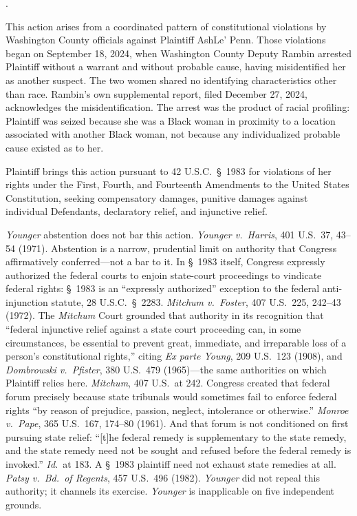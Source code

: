 \documentclass[12pt,letterpaper]{article}
\newcounter{complaintpara}
\newenvironment{paras}{%
	\begin{list}{\arabic{complaintpara}.}{%
			\setlength{\leftmargin}{0.5in}%
			\setlength{\labelwidth}{0.4in}%
			\setlength{\labelsep}{0.1in}%
			\setlength{\itemsep}{0pt}%
			\setlength{\parsep}{0pt}%
			\setlength{\topsep}{6pt}%
		}%
	}{%
	\end{list}%
}
\newcommand{\sect}{§}
\begin{document}
\begin{paras}
		\item This action arises from a coordinated pattern of constitutional
		violations by Washington County officials against Plaintiff AshLe'
		Penn. Those violations began on September 18, 2024, when Washington
		County Deputy Rambin arrested Plaintiff without a warrant and without
		probable cause, having misidentified her as another suspect. The two
		women shared no identifying characteristics other than race. Rambin's
		own supplemental report, filed December 27, 2024, acknowledges the
		misidentification. The arrest was the product of racial profiling:
		Plaintiff was seized because she was a Black woman in proximity to a
		location associated with another Black woman, not because any
		individualized probable cause existed as to her.
		
		\item Plaintiff brings this action pursuant to 42 U.S.C.\ \sect\ 1983
		for violations of her rights under the First, Fourth, and Fourteenth
		Amendments to the United States Constitution, seeking compensatory
		damages, punitive damages against individual Defendants, declaratory
		relief, and injunctive relief.
		
		\item \textit{Younger} abstention does not bar this action.
		\textit{Younger v.\ Harris}, 401 U.S.\ 37, 43--54 (1971).
		Abstention is a narrow, prudential limit on authority that Congress affirmatively conferred---not a bar to it. In \sect\ 1983 itself, Congress expressly authorized the federal courts to enjoin state-court proceedings to vindicate federal rights: \sect\ 1983 is an ``expressly authorized'' exception to the federal anti-injunction statute, 28 U.S.C.\ \S\ 2283. \textit{Mitchum v.\ Foster}, 407 U.S.\ 225, 242--43 (1972). The \textit{Mitchum} Court grounded that authority in its recognition that ``federal injunctive relief against a state court proceeding can, in some circumstances, be essential to prevent great, immediate, and irreparable loss of a person's constitutional rights,'' citing \textit{Ex parte Young}, 209 U.S.\ 123 (1908), and \textit{Dombrowski v.\ Pfister}, 380 U.S.\ 479 (1965)---the same authorities on which Plaintiff relies here. \textit{Mitchum}, 407 U.S.\ at 242. Congress created that federal forum precisely because state tribunals would sometimes fail to enforce federal rights ``by reason of prejudice, passion, neglect, intolerance or otherwise.'' \textit{Monroe v.\ Pape}, 365 U.S.\ 167, 174--80 (1961). And that forum is not conditioned on first pursuing state relief: ``[t]he federal remedy is supplementary to the state remedy, and the state remedy need not be sought and refused before the federal remedy is invoked.'' \textit{Id.}\ at 183. A \sect\ 1983 plaintiff need not exhaust state remedies at all. \textit{Patsy v.\ Bd.\ of Regents}, 457 U.S.\ 496 (1982). \textit{Younger} did not repeal this authority; it channels its exercise. \textit{Younger} is inapplicable on five independent grounds.
		
	\end{paras}
	
\end{document}
